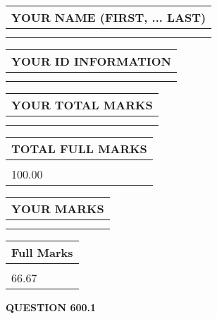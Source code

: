 \documentclass{ctexart}
\begin{document}
   
   
   
\newpage 
\setcounter{page}{ 
   600001 } 
   
   
   
   
\noindent\begin{tabular}{|l|}
\hline
YOUR NAME (FIRST, ... LAST)  \\
\hline
 \\ 
 \\ 
\hline
\end{tabular}
\hspace{0.05in} \begin{tabular}{|l|}
\hline
 YOUR   ID   INFORMATION  \\
\hline
 \\ 
 \\ 
\hline
\end{tabular}
   
   
\vspace{0.2in}\noindent\begin{tabular}{|l|}
\hline
YOUR TOTAL MARKS  \\
\hline
 \\ 
 \\ 
\hline
\end{tabular}
\hspace{0.05in} \begin{tabular}{|l|}
\hline
TOTAL FULL MARKS  \\
\hline
 \\ 
100.00 \\
\hline
\end{tabular}
   
   
 \vspace{0.2in}
 
 
 
 
   
   
  
\vspace{0.2in}
  
\noindent\begin{tabular}{|l|}
\hline
 YOUR MARKS  \\
\hline
 \\ 
 \\ 
\hline
\end{tabular}
\hspace{0.05in} \begin{tabular}{|l|}
\hline
 Full Marks  \\
\hline
 \\ 
66.67 \\
\hline
\end{tabular}
{\textbf{\Large{QUESTION
600.1 
}}}
  
\end{document}
